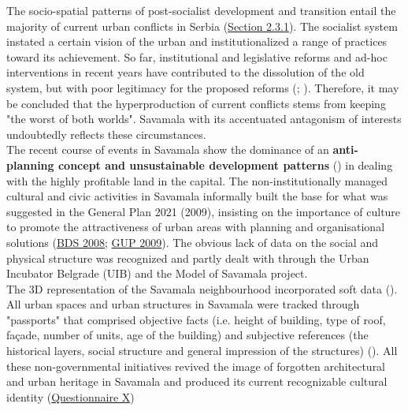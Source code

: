 \documentclass[11pt]{report}
\begin{document}
{{{{The socio-spatial patterns of post-socialist development and transition entail the majority of current urban conflicts in Serbia (\href{Section 2.3.1}{Section 2.3.1}).
The socialist system instated a certain vision of the urban and institutionalized a range of practices toward its achievement. So far, institutional and legislative reforms and ad-hoc interventions in recent years have contributed to the dissolution of the old system, but with poor legitimacy for the proposed reforms (\href{ref}{\citealt{world_bank_cities_2000}}; \href{ref}{\citealt{vujosevic_postsocijalisticka_2010}}).
Therefore, it may be concluded that the hyperproduction of current conflicts stems from keeping "the worst of both worlds".
Savamala with its accentuated antagonism of interests undoubtedly reflects these circumstances.
\\

The recent course of events in Savamala show the dominance of an  \textbf{anti-planning concept and unsustainable development patterns} (\href{ref}{\citealt{vujosevic_postsocijalisticka_2010}}) in dealing with the highly profitable land in the capital. The non-institutionally managed cultural and civic activities in Savamala informally built the base for what was suggested in the General Plan 2021 (2009), insisting on the importance of culture to promote the attractiveness of urban areas with planning and organisational solutions (\href{BDS}{BDS 2008}; \href{GP 2009}{GUP 2009}).
The obvious lack of data on the social and physical structure was recognized and partly dealt with through the Urban Incubator Belgrade (UIB) and the Model of Savamala project.
\\

The 3D representation of the Savamala neighbourhood incorporated soft data (\href{ref}{\citealt{cvetinovic_engine_2013}}).
All urban spaces and urban structures in Savamala were tracked through "passports" that comprised objective facts (i.e. height of building, type of roof, façade, number of units, age of the building) and subjective references (the historical layers, social structure and general impression of the structures) (\href{ref}{\citealt{lee_yaniya_model_2013}}).
All these non-governmental initiatives revived the image of forgotten architectural and urban heritage in Savamala and produced its current recognizable cultural identity
(\href{Questionnaire PhD Savamala}{Questionnaire X})
\\

}}}}
\end{document}
